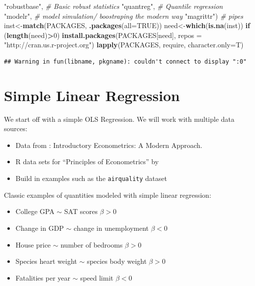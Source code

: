 \documentclass[]{book}
\newenvironment{Shaded}{\begin{snugshade}}{\end{snugshade}}
\newcommand{\CommentTok}[1]{\textcolor[rgb]{0.56,0.35,0.01}{\textit{#1}}}
\newcommand{\ControlFlowTok}[1]{\textcolor[rgb]{0.13,0.29,0.53}{\textbf{#1}}}
\newcommand{\DataTypeTok}[1]{\textcolor[rgb]{0.13,0.29,0.53}{#1}}
\newcommand{\DecValTok}[1]{\textcolor[rgb]{0.00,0.00,0.81}{#1}}
\newcommand{\KeywordTok}[1]{\textcolor[rgb]{0.13,0.29,0.53}{\textbf{#1}}}
\newcommand{\NormalTok}[1]{#1}
\newcommand{\OperatorTok}[1]{\textcolor[rgb]{0.81,0.36,0.00}{\textbf{#1}}}
\newcommand{\OtherTok}[1]{\textcolor[rgb]{0.56,0.35,0.01}{#1}}
\newcommand{\StringTok}[1]{\textcolor[rgb]{0.31,0.60,0.02}{#1}}
\providecommand{\tightlist}{%
  \setlength{\itemsep}{0pt}\setlength{\parskip}{0pt}}
\begin{document}
\begin{Shaded}
\begin{Highlighting}[]
            \StringTok{"robustbase"}\NormalTok{, }\CommentTok{# Basic robust statistics}
            \StringTok{"quantreg"}\NormalTok{, }\CommentTok{# Quantile regression}
            \StringTok{"modelr"}\NormalTok{, }\CommentTok{# model simulation/ boostraping the modern way}
            \StringTok{"magrittr"}\NormalTok{) }\CommentTok{#  pipes}
\NormalTok{inst<-}\KeywordTok{match}\NormalTok{(PACKAGES, }\KeywordTok{.packages}\NormalTok{(}\DataTypeTok{all=}\OtherTok{TRUE}\NormalTok{))}
\NormalTok{need<-}\KeywordTok{which}\NormalTok{(}\KeywordTok{is.na}\NormalTok{(inst))}
\ControlFlowTok{if}\NormalTok{ (}\KeywordTok{length}\NormalTok{(need)}\OperatorTok{>}\DecValTok{0}\NormalTok{) }\KeywordTok{install.packages}\NormalTok{(PACKAGES[need], }\DataTypeTok{repos =} \StringTok{"http://cran.us.r-project.org"}\NormalTok{)}
\KeywordTok{lapply}\NormalTok{(PACKAGES, require, }\DataTypeTok{character.only=}\NormalTok{T)}
\end{Highlighting}
\end{Shaded}

\begin{verbatim}
## Warning in fun(libname, pkgname): couldn't connect to display ":0"
\end{verbatim}

\hypertarget{simple-linear-regression}{%
\section{Simple Linear Regression}\label{simple-linear-regression}}

We start off with a simple OLS Regression. We will work with multiple data sources:

\begin{itemize}
\tightlist
\item
  Data from \citet{wooldridge2015introductory} : Introductory Econometrics: A Modern Approach.
\item
  R data sets for ``Principles of Econometrics'' by \citet{hill2008principles}
\item
  Build in examples such as the \texttt{airquality} dataset
\end{itemize}

Classic examples of quantities modeled with simple linear regression:

\begin{itemize}
\tightlist
\item
  College GPA \(\sim\) SAT scores \(\beta > 0\)
\item
  Change in GDP \(\sim\) change in unemployment \(\beta < 0\)
\item
  House price \(\sim\) number of bedrooms \(\beta > 0\)
\item
  Species heart weight \(\sim\) species body weight \(\beta > 0\)
\item
  Fatalities per year \(\sim\) speed limit \(\beta < 0\)
\end{itemize}
\end{document}
